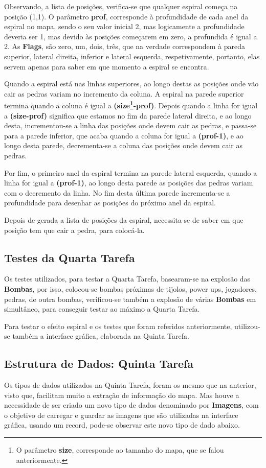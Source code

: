\documentclass[4apaper]{report}
\begin{document}
Observando, a lista de posições, verifica-se que qualquer espiral começa na posição (1,1). O parâmetro \textbf{prof}, corresponde à profundidade de cada anel da espiral no mapa, sendo o seu valor inicial 2, mas logicamente a profundidade deveria ser 1, mas devido às posições começarem em zero, a profundida é igual a 2. As \textbf{Flags}, são zero, um, dois, três, que na verdade correspondem à pareda superior, lateral direita, inferior e lateral esquerda, respetivamente, portanto, elas servem apenas para saber em que momento a espiral se encontra. 

Quando a espiral está nas linhas superiores, ao longo destas as posições onde vão cair as pedras variam no incremento da coluna. A espiral na parede superior termina quando a coluna é igual a \textbf{(size\footnote{O parâmetro \textbf{size}, corresponde ao tamanho do mapa, que se falou anteriormente.}-prof)}. Depois quando a linha for igual a \textbf{(size-prof)} significa que estamos no fim da parede lateral direita, e ao longo desta, incrementou-se a linha das posições onde devem cair as pedras, e passa-se para a parede inferior, que acaba quando a coluna for igual a \textbf{(prof-1)}, e ao longo desta parede, decrementa-se a coluna das posições onde devem cair as pedras. 

Por fim, o primeiro anel da espiral termina na parede lateral esquerda, quando a linha for igual a \textbf{(prof-1)}, ao longo desta parede as posições das pedras variam com o decremento da linha. No fim desta última parede incrementa-se a profundidade para desenhar as posições do próximo anel da espiral. 

Depois de gerada a lista de posições da espiral, necessita-se de saber em que posição tem que cair a pedra, para colocá-la.  

\subsection{Testes da Quarta Tarefa}
Os testes utilizados, para testar a Quarta Tarefa, basearam-se na explosão das \textbf{Bombas}, por isso, colocou-se bombas próximas de tijolos, power ups, jogadores, pedras, de outra bombas, verificou-se também a explosão de várias \textbf{Bombas} em simultâneo, para conseguir testar ao máximo a Quarta Tarefa. 

Para testar o efeito espiral e os testes que foram referidos anteriormente, utilizou-se também a interface gráfica, elaborada na Quinta Tarefa.

\subsection{Estrutura de Dados: Quinta Tarefa}
Os tipos de dados utilizados na Quinta Tarefa, foram os mesmo que na anterior, visto que, facilitam muito a extração de informação do mapa. Mas houve a necessidade de ser criado um novo tipo de dados denominado por \textbf{Imagens}, com o objetivo de carregar e guardar as imagens que são utilizadas na interface gráfica, usando um record, pode-se observar este novo tipo de dado abaixo.
\end{document}
